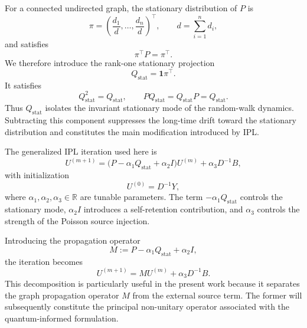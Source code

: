 \documentclass[11pt,a4paper]{article}
\begin{document}
For a connected undirected graph, the stationary distribution of \(P\) is
\[
\pi
=
\left(
\frac{d_1}{d},
\ldots,
\frac{d_n}{d}
\right)^\top,
\qquad
d=\sum_{i=1}^{n}d_i,
\]
and satisfies
\[
\pi^\top P=\pi^\top.
\]
We therefore introduce the rank-one stationary projection
\begin{equation}
Q_{\mathrm{stat}}
=
\mathbf{1}\pi^\top.
\label{eq:stationary_projection}
\end{equation}
It satisfies
\[
Q_{\mathrm{stat}}^2=Q_{\mathrm{stat}},
\qquad
P Q_{\mathrm{stat}}
=
Q_{\mathrm{stat}}P
=
Q_{\mathrm{stat}}.
\]
Thus \(Q_{\mathrm{stat}}\) isolates the invariant stationary mode of the
random-walk dynamics. Subtracting this component suppresses the long-time
drift toward the stationary distribution and constitutes the main modification
introduced by IPL.

The generalized IPL iteration used here is
\begin{equation}
U^{(m+1)}
=
\bigl(
P-\alpha_1 Q_{\mathrm{stat}}+\alpha_2 I
\bigr)U^{(m)}
+
\alpha_3D^{-1}B,
\label{eq:ipl_iteration}
\end{equation}
with initialization
\begin{equation}
U^{(0)}=D^{-1}Y,
\label{eq:ipl_initialization}
\end{equation}
where \(\alpha_1,\alpha_2,\alpha_3\in\mathbb{R}\) are tunable parameters.
The term \(-\alpha_1Q_{\mathrm{stat}}\) controls the stationary mode,
\(\alpha_2I\) introduces a self-retention contribution, and
\(\alpha_3\) controls the strength of the Poisson source injection.

Introducing the propagation operator
\begin{equation}
M
:=
P-\alpha_1Q_{\mathrm{stat}}+\alpha_2I,
\label{eq:M_operator}
\end{equation}
the iteration becomes
\begin{equation}
U^{(m+1)}
=
MU^{(m)}
+
\alpha_3D^{-1}B.
\label{eq:ipl_compact}
\end{equation}
This decomposition is particularly useful in the present work because it
separates the graph propagation operator \(M\) from the external source term.
The former will subsequently constitute the principal non-unitary operator
associated with the quantum-informed formulation.
\end{document}
